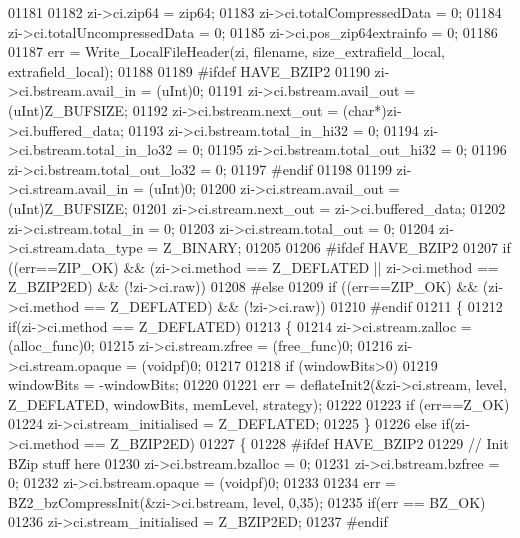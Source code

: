 \begin{DoxyCode}
01181 
01182     zi->ci.zip64 = zip64;
01183     zi->ci.totalCompressedData = 0;
01184     zi->ci.totalUncompressedData = 0;
01185     zi->ci.pos\_zip64extrainfo = 0;
01186 
01187     err = Write\_LocalFileHeader(zi, filename, size\_extrafield\_local, extrafield\_local);
01188 
01189 \textcolor{preprocessor}{#ifdef HAVE\_BZIP2}
01190     zi->ci.bstream.avail\_in = (uInt)0;
01191     zi->ci.bstream.avail\_out = (uInt)Z\_BUFSIZE;
01192     zi->ci.bstream.next\_out = (\textcolor{keywordtype}{char}*)zi->ci.buffered\_data;
01193     zi->ci.bstream.total\_in\_hi32 = 0;
01194     zi->ci.bstream.total\_in\_lo32 = 0;
01195     zi->ci.bstream.total\_out\_hi32 = 0;
01196     zi->ci.bstream.total\_out\_lo32 = 0;
01197 #endif
01198 
01199     zi->ci.stream.avail\_in = (uInt)0;
01200     zi->ci.stream.avail\_out = (uInt)Z\_BUFSIZE;
01201     zi->ci.stream.next\_out = zi->ci.buffered\_data;
01202     zi->ci.stream.total\_in = 0;
01203     zi->ci.stream.total\_out = 0;
01204     zi->ci.stream.data\_type = Z\_BINARY;
01205 
01206 \textcolor{preprocessor}{#ifdef HAVE\_BZIP2}
01207     \textcolor{keywordflow}{if} ((err==ZIP\_OK) && (zi->ci.method == Z\_DEFLATED || zi->ci.method == Z\_BZIP2ED) && (!zi->ci.raw))
01208 #\textcolor{keywordflow}{else}
01209     \textcolor{keywordflow}{if} ((err==ZIP\_OK) && (zi->ci.method == Z\_DEFLATED) && (!zi->ci.raw))
01210 #endif
01211     \{
01212         \textcolor{keywordflow}{if}(zi->ci.method == Z\_DEFLATED)
01213         \{
01214           zi->ci.stream.zalloc = (alloc\_func)0;
01215           zi->ci.stream.zfree = (free\_func)0;
01216           zi->ci.stream.opaque = (voidpf)0;
01217 
01218           \textcolor{keywordflow}{if} (windowBits>0)
01219               windowBits = -windowBits;
01220 
01221           err = deflateInit2(&zi->ci.stream, level, Z\_DEFLATED, windowBits, memLevel, strategy);
01222 
01223           \textcolor{keywordflow}{if} (err==Z\_OK)
01224               zi->ci.stream\_initialised = Z\_DEFLATED;
01225         \}
01226         \textcolor{keywordflow}{else} \textcolor{keywordflow}{if}(zi->ci.method == Z\_BZIP2ED)
01227         \{
01228 \textcolor{preprocessor}{#ifdef HAVE\_BZIP2}
01229             \textcolor{comment}{// Init BZip stuff here}
01230           zi->ci.bstream.bzalloc = 0;
01231           zi->ci.bstream.bzfree = 0;
01232           zi->ci.bstream.opaque = (voidpf)0;
01233 
01234           err = BZ2\_bzCompressInit(&zi->ci.bstream, level, 0,35);
01235           \textcolor{keywordflow}{if}(err == BZ\_OK)
01236             zi->ci.stream\_initialised = Z\_BZIP2ED;
01237 \textcolor{preprocessor}{#endif}

\end{DoxyCode}
